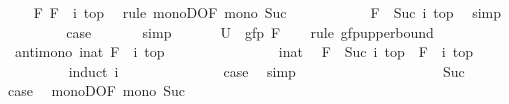 \begin{isabellebody}
\ \isamarkupfalse%
\ {\isachardoublequoteopen}{\isasymdots}\ {\isasymle}\ F\ {\isacharparenleft}{\isacharparenleft}F\ {\isacharcircum}{\isacharcircum}\ i{\isacharparenright}\ top{\isacharparenright}{\isachardoublequoteclose}\ \isamarkupfalse%
\ {\isacharparenleft}rule\ monoD{\isacharbrackleft}OF\ mono\ Suc{\isacharbrackright}{\isacharparenright}\isanewline
\ \ \ \ \ \ \isamarkupfalse%
\ \isamarkupfalse%
\ {\isachardoublequoteopen}{\isasymdots}\ {\isacharequal}\ {\isacharparenleft}F\ {\isacharcircum}{\isacharcircum}\ Suc\ i{\isacharparenright}\ top{\isachardoublequoteclose}\ \isamarkupfalse%
\ simp\isanewline
\ \ \ \ \ \ \isamarkupfalse%
\ \isamarkupfalse%
\ {\isacharquery}case\ \isacommand{{\isachardot}}\isamarkupfalse%
\isanewline
\ \ \ \ \isamarkupfalse%
\ simp\isanewline
\ \ \isamarkupfalse%
\isanewline
\ \ \isamarkupfalse%
\ {\isachardoublequoteopen}{\isacharquery}U\ {\isasymle}\ gfp\ F{\isachardoublequoteclose}\isanewline
\ \ \isamarkupfalse%
\ {\isacharparenleft}rule\ gfp{\isacharunderscore}upperbound{\isacharparenright}\isanewline
\ \ \ \ \isamarkupfalse%
\ {\isacharasterisk}{\isacharcolon}\ {\isachardoublequoteopen}antimono\ {\isacharparenleft}{\isasymlambda}i{\isacharcolon}{\isacharcolon}nat{\isachardot}\ {\isacharparenleft}F\ {\isacharcircum}{\isacharcircum}\ i{\isacharparenright}\ top{\isacharparenright}{\isachardoublequoteclose}\isanewline
\ \ \ \ \isamarkupfalse%
\ {\isacharminus}\isanewline
\ \ \ \ \ \ \isacommand{{\isacharbraceleft}}\isamarkupfalse%
\ \isamarkupfalse%
\ i{\isacharcolon}{\isacharcolon}nat\ \isamarkupfalse%
\ {\isachardoublequoteopen}{\isacharparenleft}F\ {\isacharcircum}{\isacharcircum}\ Suc\ i{\isacharparenright}\ top\ {\isasymle}\ {\isacharparenleft}F\ {\isacharcircum}{\isacharcircum}\ i{\isacharparenright}\ top{\isachardoublequoteclose}\isanewline
\ \ \ \ \ \ \ \ \isamarkupfalse%
\ {\isacharparenleft}induct\ i{\isacharparenright}\isanewline
\ \ \ \ \ \ \ \ \ \ \isamarkupfalse%
\ {}\ \isamarkupfalse%
\ {\isacharquery}case\ \isamarkupfalse%
\ simp\isanewline
\ \ \ \ \ \ \ \ \isamarkupfalse%
\isanewline
\ \ \ \ \ \ \ \ \ \ \isamarkupfalse%
\ Suc\ \isamarkupfalse%
\ {\isacharquery}case\ \isamarkupfalse%
\ monoD{\isacharbrackleft}OF\ mono\ Suc{\isacharbrackright}\ \isamarkupfalse%

\end{isabellebody}
